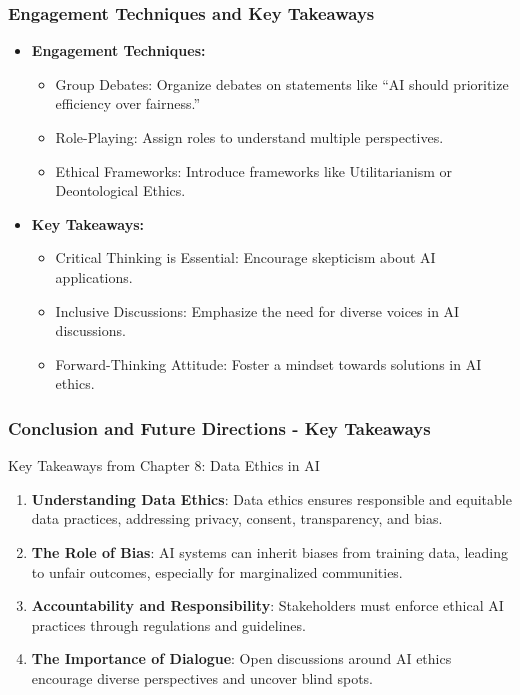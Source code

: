 \documentclass[aspectratio=169]{beamer}
\begin{document}
\begin{frame}[fragile]
    \frametitle{Engagement Techniques and Key Takeaways}
    \begin{itemize}
        \item \textbf{Engagement Techniques:}
        \begin{itemize}
            \item Group Debates: Organize debates on statements like ``AI should prioritize efficiency over fairness.''
            \item Role-Playing: Assign roles to understand multiple perspectives.
            \item Ethical Frameworks: Introduce frameworks like Utilitarianism or Deontological Ethics.
        \end{itemize}

        \item \textbf{Key Takeaways:}
        \begin{itemize}
            \item Critical Thinking is Essential: Encourage skepticism about AI applications.
            \item Inclusive Discussions: Emphasize the need for diverse voices in AI discussions.
            \item Forward-Thinking Attitude: Foster a mindset towards solutions in AI ethics.
        \end{itemize}
    \end{itemize}
\end{frame}

\begin{frame}[fragile]
    \frametitle{Conclusion and Future Directions - Key Takeaways}
    \begin{block}{Key Takeaways from Chapter 8: Data Ethics in AI}
        \begin{enumerate}
            \item \textbf{Understanding Data Ethics}: 
                Data ethics ensures responsible and equitable data practices, addressing privacy, consent, transparency, and bias.
                
            \item \textbf{The Role of Bias}: 
                AI systems can inherit biases from training data, leading to unfair outcomes, especially for marginalized communities.
                
            \item \textbf{Accountability and Responsibility}:
                Stakeholders must enforce ethical AI practices through regulations and guidelines.
                
            \item \textbf{The Importance of Dialogue}: 
                Open discussions around AI ethics encourage diverse perspectives and uncover blind spots.
        \end{enumerate}
    \end{block}
\end{frame}
\end{document}
